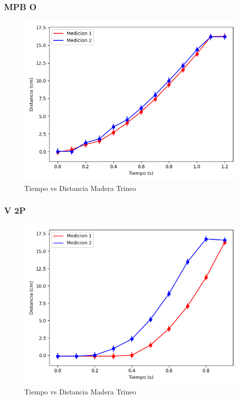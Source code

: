 \documentclass[12pt,a4]{article}
\begin{document}
\subsubsection{MPB O}

\begin{figure}[H]
    \centering
    \includegraphics[width=0.9\linewidth]{TiempoVsDistanciaPisoMaderaMPB_O.png}
    \caption{Tiempo vs Distancia Madera Trineo}
    \label{fig:TvDM_OP piso trineo}
\end{figure}

\subsubsection{V 2P}

\begin{figure}[H]
    \centering
    \includegraphics[width=0.9\linewidth]{TiempoVsDistanciaPisoMaderaV_2P.png}
    \caption{Tiempo vs Distancia Madera Trineo}
    \label{fig:TvDV_2P piso trineo}
\end{figure}
\end{document}
